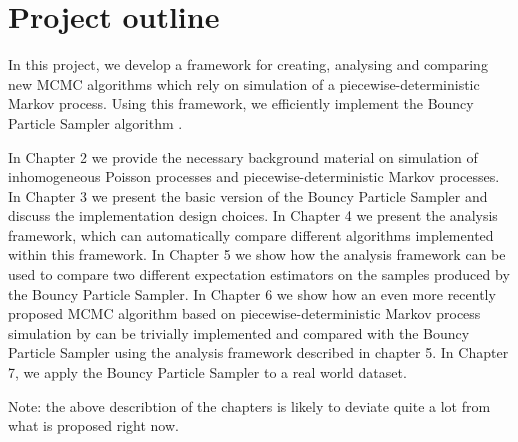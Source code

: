 \documentclass[report.tex]{subfiles}
\begin{document}
\section{Project outline}

In this project, we develop a framework for creating,
analysing and comparing new MCMC algorithms which
rely on simulation of a piecewise-deterministic Markov process.
Using this framework, we efficiently implement the Bouncy Particle
Sampler algorithm \cite{bouchard2015bouncy}.

In Chapter 2 we provide the necessary background material on simulation of
inhomogeneous Poisson processes and piecewise-deterministic Markov processes.
In Chapter 3 we present the basic version of the Bouncy Particle Sampler and discuss
the implementation design choices.
In Chapter 4 we present the analysis framework,
which can automatically compare different algorithms implemented within this
framework.
In Chapter 5 we show how the analysis framework can be used to
compare two different expectation estimators on the samples produced by the
Bouncy Particle Sampler.
In Chapter 6 we show how an even more recently proposed
MCMC algorithm based on piecewise-deterministic Markov process simulation by
\citet{bierkens2016zig} can be trivially implemented and compared with the Bouncy
Particle Sampler using the analysis framework described in chapter 5.
In Chapter 7, we apply the Bouncy Particle Sampler to a real world dataset.

\par\vspace{3em}\noindent
Note: the above describtion of the chapters is likely to deviate quite a lot
from what is proposed right now.
\end{document}
